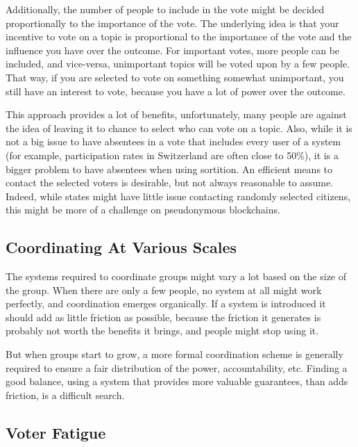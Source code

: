 \begin{description}
    Additionally, the number of people to include in the vote might be decided proportionally to the importance of the vote.
    The underlying idea is that your incentive to vote on a topic is proportional to the importance of the vote and the influence you have over the outcome.
    For important votes, more people can be included, and vice-versa, unimportant topics will be voted upon by a few people.
    That way, if you are selected to vote on something somewhat unimportant, you still have an interest to vote, because you have a lot of power over the outcome.

    This approach provides a lot of benefits, unfortunately, many people are against the idea of leaving it to chance to select who can vote on a topic.
    Also, while it is not a big issue to have absentees in a vote that includes every user of a system (for example, participation rates in Switzerland are often close to 50\%), it is a bigger problem to have absentees when using sortition.
    An efficient means to contact the selected voters is desirable, but not always reasonable to assume.
    Indeed, while states might have little issue contacting randomly selected citizens, this might be more of a challenge on pseudonymous blockchains.
\end{description}

\subsection{Coordinating At Various Scales}

The systems required to coordinate groups might vary a lot based on the size of the group.
When there are only a few people, no system at all might work perfectly, and coordination emerges organically.
If a system is introduced it should add as little friction as possible, because the friction it generates is probably not worth the benefits it brings, and people might stop using it.

But when groups start to grow, a more formal coordination scheme is generally required to ensure a fair distribution of the power, accountability, etc.
Finding a good balance, using a system that provides more valuable guarantees, than adds friction, is a difficult search.

\subsection{Voter Fatigue}
\label{sec:voter_fatigue}

